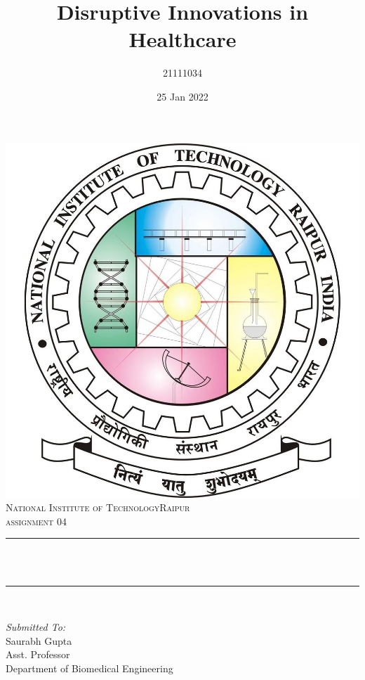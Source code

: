 \documentclass[12pt]{article}
\title{Disruptive Innovations in Healthcare}								%
\author{21111034}								%
\date{25 Jan 2022}											%
\makeatletter
\let\thetitle\@title
\makeatother
\begin{document}

\begin{titlepage}
	\centering
    \vspace*{0.5 cm}
    \includegraphics[scale = 0.20]{logo.jpeg}\\[1.0 cm]	%
    \textsc{\LARGE  National Institute of Technology\newline\newline Raipur}\\[2.0 cm]	%
	\textsc{\Large assignment 04}\\[0.5 cm]				%
	\rule{\linewidth}{0.2 mm} \\[0.4 cm]
	{ \huge \bfseries \thetitle}\\
	\rule{\linewidth}{0.2 mm} \\[1.0 cm]
	
	\begin{minipage}{0.4\textwidth}
		\begin{flushleft} \large
			\emph{Submitted To:}\\
			Saurabh Gupta\\
            Asst. Professor\\
            Department of Biomedical Engineering\\
			\end{flushleft}
			\end{minipage}~
			\begin{minipage}{0.4\textwidth}
            

\end{minipage}
\end{titlepage}
\end{document}
